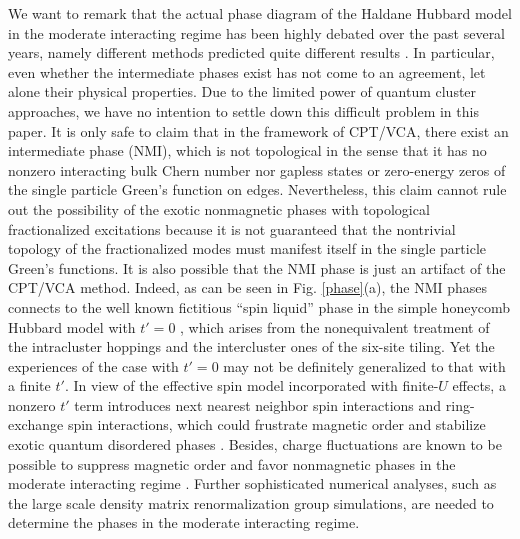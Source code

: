 \documentclass[12pt]{iopart}
\begin{document}
\par We want to remark that the actual phase diagram of the Haldane Hubbard model in the moderate interacting regime has been highly debated over the past several years, namely different methods predicted quite different results \cite{HZKL_PRB2011-1,HZKL_PRB2011-2,MR_PRB2013,HRP_PRB2015,ZSWZ_PRB2015,WFSM_PRB2016,HCPP_PRL2016,VSLTHT_PRL2016,IWT_PRB2016,ASHP_PRB2016,GJMP_PRB2016,GR_NJP2018,LTTNNH_PBCM2018}. In particular, even whether the intermediate phases exist has not come to an agreement, let alone their physical properties. Due to the limited power of quantum cluster approaches, we have no intention to settle down this difficult problem in this paper. It is only safe to claim that in the framework of CPT/VCA, there exist an intermediate phase (NMI), which is not topological in the sense that it has no nonzero interacting bulk Chern number nor gapless states or zero-energy zeros of the single particle Green's function on edges. Nevertheless, this claim cannot rule out the possibility of the exotic nonmagnetic phases with topological fractionalized excitations \cite{HZKL_PRB2011-2,MR_PRB2013,HRP_PRB2015,HCPP_PRL2016} because it is not guaranteed that the nontrivial topology of the fractionalized modes must manifest itself in the single particle Green's functions. It is also possible that the NMI phase is just an artifact of the CPT/VCA method. Indeed, as can be seen in Fig. \ref{phase}(a), the NMI phases connects to the well known fictitious ``spin liquid'' phase in the simple honeycomb Hubbard model with $t'=0$ \cite{MLWAM_N2010,SOY_SR2012,AH_PRX2013,HD_PRL2013}, which arises from the nonequivalent treatment of the intracluster hoppings and the intercluster ones of the six-site tiling\cite{LRTR_PRB2014}. Yet the experiences of the case with $t'=0$ may not be definitely generalized to that with a finite $t'$. In view of the effective spin model incorporated with finite-$U$ effects, a nonzero $t'$ term introduces next nearest neighbor spin interactions and ring-exchange spin interactions, which could frustrate magnetic order and stabilize exotic quantum disordered phases \cite{HRP_PRB2015,HCPP_PRL2016}. Besides, charge fluctuations are known to be possible to suppress magnetic order and favor nonmagnetic phases in the moderate interacting regime \cite{SS_PRL2008,YKK_PRL2009,RLRT_PRL2015}. Further sophisticated numerical analyses, such as the large scale density matrix renormalization group simulations, are needed to determine the phases in the moderate interacting regime.
\end{document}
